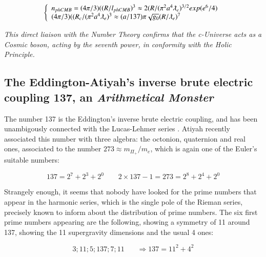 \documentclass[a4paper,9pt]{article}
\newcounter{row}
\begin{document}
\begin{equation}
 \left\{
    \begin{array}{ll}
    n_{phCMB} = (4\pi/3)((R/l_{phCMB})^{3} \approx 2(R/(\pi^2a^4\lambdabar_e)^{3/2} exp(e^6/4)\\
    
     (4\pi/3)((R_c/(\pi^2a^4\lambdabar_e)^{3} \approx (a/137)\pi \sqrt{g_0} (R/\lambdabar_e)^7

    \end{array}
\right.
\end{equation}

\textit{This direct liaison with the Number Theory confirms that the c-Universe acts as a Cosmic boson, acting by the seventh power, in conformity with the Holic Principle.}

 

 
 
 

\subsection{The Eddington-Atiyah's inverse brute electric coupling 137, an \textit{Arithmetical Monster}}

The number 137 is the Eddington's inverse brute electric coupling, and has been unambigously connected with the Lucas-Lehmer series \cite{Sanchez2}. Atiyah recently associated this number with three algebra: the octonion, quaternion and real ones, associated to the number $273 \approx m_{\Pi_+}/m_e $, which is again one of the Euler's suitable numbers:

\begin{equation}
137 = 2^7 + 2^3 + 2^0    ~~~~~~~~~2\times 137 - 1 = 273 = 2^8 + 2^4 + 2^0 
 \end{equation}

Strangely enough, it seems that nobody have looked for the prime numbers that appear in the harmonic series, which is the single pole of the Rieman series, precisely known to inform about the distribution of prime numbers. The six first prime numbers appearing are the following, showing a symmetry of 11 around 137, showing the 11 supergravity dimensions and the usual 4 ones:

\begin{equation}
3; 11; 5; 137; 7; 11   ~~~~~~~~ \Rightarrow 137 = 11^2 + 4^2 
 \end{equation}
\end{document}
